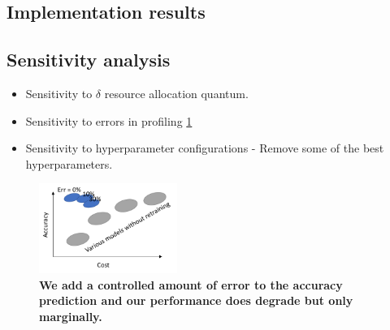 


\subsection{Implementation results}

\subsection{Sensitivity analysis}
\begin{itemize}
    \item Sensitivity to $\delta$ resource allocation quantum. 
    \item Sensitivity to errors in profiling \cref{fig:sensitivity-accuracy-error}
    \item Sensitivity to hyperparameter configurations - Remove some of the best hyperparameters. 
\end{itemize}

\begin{figure}
	\includegraphics[width=0.4\textwidth]{figures/eval_placeholders/sensitivity-accuracy-error.pdf}
	\caption{\small \bf We add a controlled amount of error to the accuracy prediction and our performance does degrade but only marginally. }
	\label{fig:sensitivity-accuracy-error}
\end{figure}


